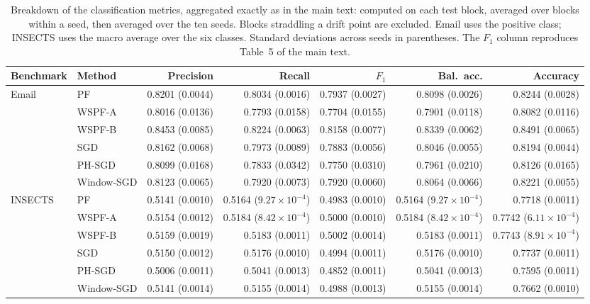 \begin{table}[htbp]
\centering
\scriptsize
\setlength{\tabcolsep}{2pt}
\caption{Breakdown of the classification metrics, aggregated exactly as in the main text: computed on each test block, averaged over blocks within a seed, then averaged over the ten seeds. Blocks straddling a drift point are excluded. Email uses the positive class; INSECTS uses the macro average over the six classes. Standard deviations across seeds in parentheses. The $F_1$ column reproduces Table~5 of the main text.}
\label{tab:s4_classification}
\begin{tabular}{@{}llrrrrr@{}}
\toprule
Benchmark & Method & Precision & Recall & $F_1$ & Bal.\ acc. & Accuracy \\
\midrule
Email & PF & 0.8201 (0.0044) & 0.8034 (0.0016) & 0.7937 (0.0027) & 0.8098 (0.0026) & 0.8244 (0.0028) \\
 & WSPF-A & 0.8016 (0.0136) & 0.7793 (0.0158) & 0.7704 (0.0155) & 0.7901 (0.0118) & 0.8082 (0.0116) \\
 & WSPF-B & 0.8453 (0.0085) & 0.8224 (0.0063) & 0.8158 (0.0077) & 0.8339 (0.0062) & 0.8491 (0.0065) \\
 & SGD & 0.8162 (0.0068) & 0.7973 (0.0089) & 0.7883 (0.0056) & 0.8046 (0.0055) & 0.8194 (0.0044) \\
 & PH-SGD & 0.8099 (0.0168) & 0.7833 (0.0342) & 0.7750 (0.0310) & 0.7961 (0.0210) & 0.8126 (0.0165) \\
 & Window-SGD & 0.8123 (0.0065) & 0.7920 (0.0073) & 0.7920 (0.0060) & 0.8064 (0.0066) & 0.8221 (0.0055) \\
\midrule
INSECTS & PF & 0.5141 (0.0010) & 0.5164 ($9.27\times 10^{-4}$) & 0.4983 (0.0010) & 0.5164 ($9.27\times 10^{-4}$) & 0.7718 (0.0011) \\
 & WSPF-A & 0.5154 (0.0012) & 0.5184 ($8.42\times 10^{-4}$) & 0.5000 (0.0010) & 0.5184 ($8.42\times 10^{-4}$) & 0.7742 ($6.11\times 10^{-4}$) \\
 & WSPF-B & 0.5159 (0.0019) & 0.5183 (0.0011) & 0.5002 (0.0014) & 0.5183 (0.0011) & 0.7743 ($8.91\times 10^{-4}$) \\
 & SGD & 0.5150 (0.0012) & 0.5176 (0.0010) & 0.4994 (0.0011) & 0.5176 (0.0010) & 0.7737 (0.0011) \\
 & PH-SGD & 0.5006 (0.0011) & 0.5041 (0.0013) & 0.4852 (0.0011) & 0.5041 (0.0013) & 0.7595 (0.0011) \\
 & Window-SGD & 0.5141 (0.0014) & 0.5155 (0.0014) & 0.4988 (0.0013) & 0.5155 (0.0014) & 0.7662 (0.0010) \\
\bottomrule
\end{tabular}
\end{table}
